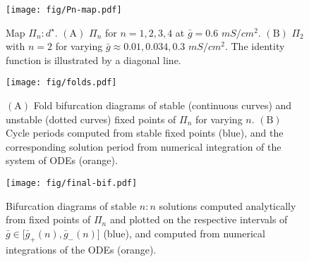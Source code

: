 \documentclass[utf8, draft]{frontiersFPHY} %
\newcommand{\gbar}{\bar g}
\begin{document}
\begin{figure}[h!]
  \centering
  \texttt{[image: fig/Pn-map.pdf]}
  \caption{Map $\Pi_{n}:d^{\star}$. $\bm{\mathrm{(A)}}$ $\Pi_{n}$ for $n=1,2,3,4$
  at $\gbar=0.6$ $\si{mS/cm^{2}}$. $\bm{\mathrm{(B)}}$ $\Pi_{2}$ with $n=2$ for
  varying $\gbar \approx 0.01, 0.034, 0.3$ $\si{mS/cm^{2}}$. The identity function is
  illustrated by a diagonal line.~\label{fig:Pn-map}}
\end{figure}

\begin{figure}[h!]
  \centering
  \texttt{[image: fig/folds.pdf]}
  \caption{$\bm{\mathrm{(A)}}$ Fold bifurcation diagrams of stable (continuous curves)
    and unstable (dotted curves) fixed points of $\Pi_{n}$ for varying $n$.
    $\bm{\mathrm{(B)}}$ Cycle periods computed from stable fixed points (blue), and the
    corresponding solution period from numerical integration of the system of ODEs
    (orange).~\label{fig:folds}}
\end{figure}

\begin{figure}[h!]
  \centering
  \texttt{[image: fig/final-bif.pdf]}
  \caption{Bifurcation diagrams of stable $n:n$ solutions computed analytically from
    fixed points of $\Pi_n$ and plotted on the respective intervals of $\gbar\in
    \big[\gbar_+(n),\gbar_-(n)\big]$ (blue), and computed from numerical integrations of
    the ODEs (orange).~\label{fig:final-bif}}
\end{figure}
\end{document}
